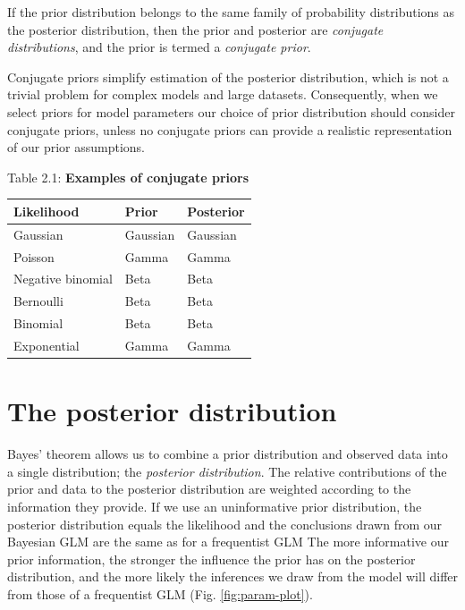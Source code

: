 \documentclass[
]{book}
\begin{document}
If the prior distribution belongs to the same family of probability distributions as the posterior distribution, then the prior and posterior are \emph{conjugate distributions}, and the prior is termed a \emph{conjugate prior}.

Conjugate priors simplify estimation of the posterior distribution, which is not a trivial problem for complex models and large datasets. Consequently, when we select priors for model parameters our choice of prior distribution should consider conjugate priors, unless no conjugate priors can provide a realistic representation of our prior assumptions.

Table 2.1: \textbf{Examples of conjugate priors}

\begin{longtable}[]{@{}lll@{}}
\toprule
Likelihood & Prior & Posterior \\
\midrule
\endhead
Gaussian & Gaussian & Gaussian \\
Poisson & Gamma & Gamma \\
Negative binomial & Beta & Beta \\
Bernoulli & Beta & Beta \\
Binomial & Beta & Beta \\
Exponential & Gamma & Gamma \\
\bottomrule
\end{longtable}

\hypertarget{post-dist}{%
\section{The posterior distribution}\label{post-dist}}

Bayes' theorem allows us to combine a prior distribution and observed data into a single distribution; the \emph{posterior distribution}. The relative contributions of the prior and data to the posterior distribution are weighted according to the information they provide. If we use an uninformative prior distribution, the posterior distribution equals the likelihood and the conclusions drawn from our Bayesian GLM are the same as for a frequentist GLM The more informative our prior information, the stronger the influence the prior has on the posterior distribution, and the more likely the inferences we draw from the model will differ from those of a frequentist GLM (Fig. \ref{fig:param-plot}).
\end{document}

